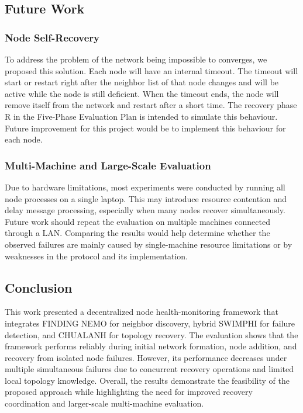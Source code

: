 \subsection{Future Work}

\subsubsection{Node Self-Recovery}
\label{subsubsec:node-self-recovery}
To address the problem of the network being impossible to converges, we proposed this solution. Each node will have an
internal timeout. The timeout will start or restart right after the neighbor list of that node changes and will be
active while the node is still deficient. When the timeout ends, the node will remove itself from the network and
restart after a short time. The recovery phase R in the Five-Phase Evaluation Plan is intended to simulate this
behaviour. Future improvement for this project would be to implement this behaviour for each node.

\subsubsection{Multi-Machine and Large-Scale Evaluation}
\label{subsubsec:large-scale-evaluation}

Due to hardware limitations, most experiments were conducted by running all node processes on a single laptop. This may
introduce resource contention and delay message processing, especially when many nodes recover simultaneously. Future
work should repeat the evaluation on multiple machines connected through a LAN. Comparing the results would help
determine whether the observed failures are mainly caused by single-machine resource limitations or by weaknesses in
the protocol and its implementation.

\subsection{Conclusion}

This work presented a decentralized node health-monitoring framework that integrates FINDING NEMO for neighbor
discovery, hybrid SWIMPHI for failure detection, and CHUALANH for topology recovery. The evaluation shows that the
framework performs reliably during initial network formation, node addition, and recovery from isolated node failures.
However, its performance decreases under multiple simultaneous failures due to concurrent recovery operations and
limited local topology knowledge. Overall, the results demonstrate the feasibility of the proposed approach while
highlighting the need for improved recovery coordination and larger-scale multi-machine evaluation.
